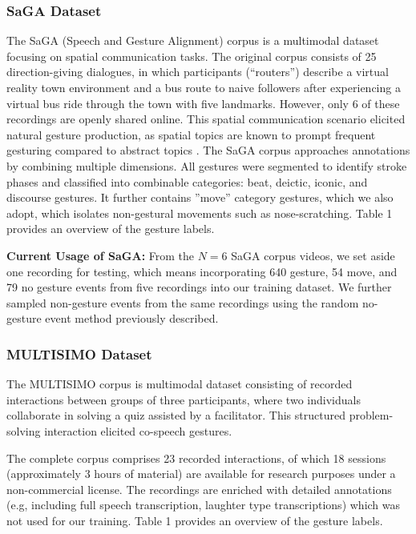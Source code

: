 \documentclass[11pt,headings=small,cleardoublepage=empty,tocflat,numbers=noenddot,twoside,captions=tableheading]{scrbook}
\begin{document}
\begin{refsection}
\subsubsection{SaGA Dataset}
The SaGA (Speech and Gesture Alignment) corpus \parencite{luckingBielefeldSpeechGesture2010} is a multimodal dataset focusing on spatial communication tasks. The original corpus consists of 25 direction-giving dialogues, in which participants (``routers'') describe a virtual reality town environment and a bus route to naive followers after experiencing a virtual bus ride through the town with five landmarks. However, only 6 of these recordings are openly shared online. This spatial communication scenario elicited natural gesture production, as spatial topics are known to prompt frequent gesturing compared to abstract topics \parencite{alibaliGestureSpatialCognition2005}.
The SaGA corpus approaches annotations by combining multiple dimensions. All gestures were segmented to identify stroke phases and classified into combinable categories: beat, deictic, iconic, and discourse gestures. It further contains ''move'' category gestures, which we also adopt, which isolates non-gestural movements such as nose-scratching. Table 1 provides an overview of the gesture labels.

\textbf{Current Usage of SaGA:} From the $N=6$ SaGA corpus videos, we set aside one recording for testing, which means incorporating 640 gesture, 54 move, and 79 no gesture events from five recordings into our training dataset. We further sampled non-gesture events from the same recordings using the random no-gesture event method previously described. 

\subsubsection{MULTISIMO Dataset}
The MULTISIMO corpus \parencite{koutsombogeraModelingCollaborativeMultimodal2018} is multimodal dataset consisting of recorded interactions between groups of three participants, where two individuals collaborate in solving a quiz assisted by a facilitator. This structured problem-solving interaction elicited co-speech gestures.

The complete corpus comprises 23 recorded interactions, of which 18 sessions (approximately 3 hours of material) are available for research purposes under a non-commercial license. The recordings are enriched with detailed annotations (e.g, including full speech transcription, laughter type transcriptions) which was not used for our training. Table 1 provides an overview of the gesture labels.


\end{refsection}
\end{document}
